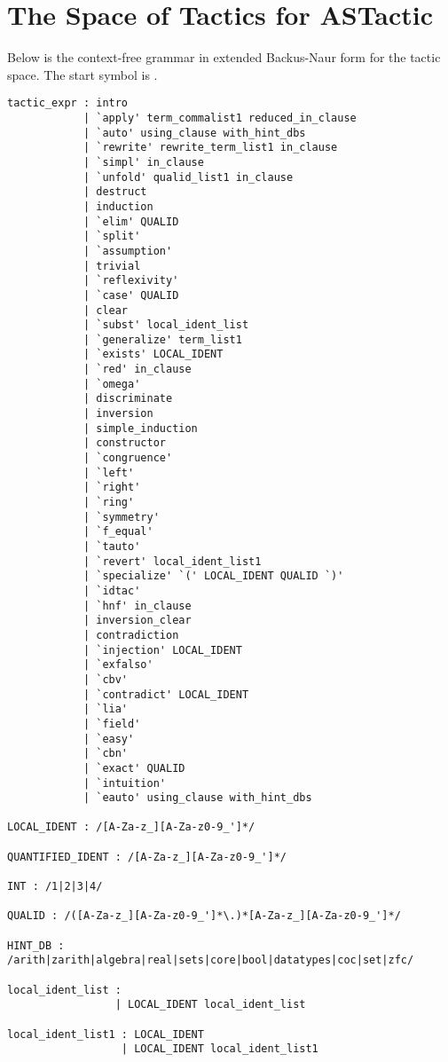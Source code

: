 \documentclass{article}
\begin{document}
\clearpage
\onecolumn


\section{The Space of Tactics for ASTactic}
\label{appendix:tac_space}


Below is the context-free grammar in extended Backus-Naur form for the tactic space.
The start symbol is .


\begin{lstlisting}[mathescape]
tactic_expr : intro
            | `apply' term_commalist1 reduced_in_clause
            | `auto' using_clause with_hint_dbs
            | `rewrite' rewrite_term_list1 in_clause
            | `simpl' in_clause
            | `unfold' qualid_list1 in_clause
            | destruct
            | induction
            | `elim' QUALID
            | `split'
            | `assumption'
            | trivial
            | `reflexivity'
            | `case' QUALID
            | clear
            | `subst' local_ident_list
            | `generalize' term_list1
            | `exists' LOCAL_IDENT
            | `red' in_clause
            | `omega'
            | discriminate
            | inversion
            | simple_induction
            | constructor
            | `congruence'
            | `left'
            | `right'
            | `ring'
            | `symmetry'
            | `f_equal'
            | `tauto'
            | `revert' local_ident_list1
            | `specialize' `(' LOCAL_IDENT QUALID `)'
            | `idtac'
            | `hnf' in_clause
            | inversion_clear
            | contradiction
            | `injection' LOCAL_IDENT
            | `exfalso'
            | `cbv'
            | `contradict' LOCAL_IDENT
            | `lia'
            | `field'
            | `easy'
            | `cbn'
            | `exact' QUALID
            | `intuition'
            | `eauto' using_clause with_hint_dbs

LOCAL_IDENT : /[A-Za-z_][A-Za-z0-9_']*/

QUANTIFIED_IDENT : /[A-Za-z_][A-Za-z0-9_']*/

INT : /1|2|3|4/

QUALID : /([A-Za-z_][A-Za-z0-9_']*\.)*[A-Za-z_][A-Za-z0-9_']*/

HINT_DB : /arith|zarith|algebra|real|sets|core|bool|datatypes|coc|set|zfc/

local_ident_list :
                 | LOCAL_IDENT local_ident_list

local_ident_list1 : LOCAL_IDENT
                  | LOCAL_IDENT local_ident_list1


\end{lstlisting}
\end{document}
